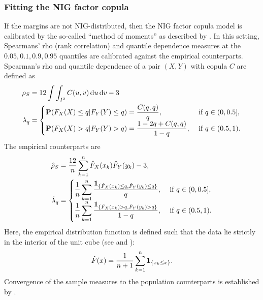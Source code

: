 \subsubsection{Fitting the NIG factor copula}
\label{sec:fitting-nig-factor}

If the margins are not NIG-distributed, then the NIG factor copula
model is calibrated by the so-called ``method of moments'' as
described by \citep{Oh2013}. In this setting, Spearmans' rho (rank
correlation) and quantile dependence measures at the $0.05, 0.1, 0.9,
0.95$ quantiles are calibrated against the empirical
counterparts. Spearman's rho and quantile dependence of a pair $(X,Y)$
with copula $C$ are defined as 
\begin{align}
  \rho_S &= 12 \int\int_{I^2} C(u,v)\, {\rm d} u\, {\rm d} v-3\label{eq:10}\\
  \lambda_q &=
  \begin{cases}
    {\bf P}(F_X(X)\leq q| F_Y(Y)\leq q) = \displaystyle \frac{C(q,q)}{q},
    &\text{ if } q\in (0,0.5],\\
    {\bf P}(F_X(X)>q|F_Y(Y)>q) =\displaystyle \frac{1-2q+C(q,q)} {1-q},
    &\text{ if } q\in (0.5,1). 
  \end{cases}
\end{align}
The empirical counterparts are
\begin{align*}
  \hat\rho_S &= \frac{12}{n} \sum_{k=1}^n \hat F_X(x_k) \hat F_Y(y_k)
               -3,\\
  \hat\lambda_q &=
                  \begin{cases}
                    \displaystyle\frac{1}{n} \sum_{k=1}^n \frac{\textbf{1}_{\{\hat
                        F_X(x_k)\leq q, \hat F_Y(y_k)\leq q\}}} {q},
                    &\text { if } q\in (0, 0.5],\\
                    \displaystyle \frac{1}{n} \sum_{k=1}^n
                    \frac{\textbf{1}_{\{\hat F_X(x_k)>q, \hat F_Y(y_k)>q\}}}
                    {1-q}, &\text { if } q\in (0.5,1). 
                  \end{cases}
\end{align*}
Here, the empirical distribution function is defined such that the
data lie strictly in the interior of the unit cube (see \citep{Oh2013}
and \citep[p.\ 232]{McNeil2005}):
\begin{equation*}
  \hat F(x) = \frac{1}{n+1} \sum_{k=1}^n \textbf{1}_{\{x_k\leq x\}}. 
\end{equation*}
Convergence of the sample measures to the population counterparts is
established by \citep{Fermanian2004}.

